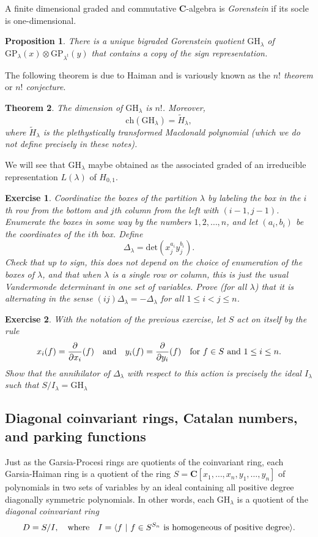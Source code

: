 \documentclass[12pt, reqno]{amsart}
\numberwithin{equation}{section}
\theoremstyle{definition}
\theoremstyle{plain}
\newtheorem{theorem}{Theorem}[section]
\newtheorem{proposition}[theorem]{Proposition}
\newtheorem{exercise}{Exercise}
\newcommand{\CC}{\mathbf{C}}
\newcommand{\la}{\langle}
\newcommand{\ra}{\rangle}
\begin{document}
A finite dimensional graded and commutative $\CC$-algebra is \emph{Gorenstein} if its socle is one-dimensional.

\begin{proposition}
There is a unique bigraded Gorenstein quotient $\mathrm{GH}_\lambda$ of $\mathrm{GP}_\lambda(x) \otimes \mathrm{GP}_{\lambda^t}(y)$ that contains a copy of the sign representation.
\end{proposition}

The following theorem is due to Haiman and is variously known as the \emph{$n!$ theorem} or \emph{$n!$ conjecture}.
\begin{theorem}
The dimension of $\mathrm{GH}_\lambda$ is $n!$. Moreover, 
$$\mathrm{ch}(\mathrm{GH}_\lambda)=\widetilde{H}_\lambda,$$ where $\widetilde{H}_\lambda$ is the plethystically transformed Macdonald polynomial (which we do not define precisely in these notes).
\end{theorem} We will see that $\mathrm{GH}_\lambda$ maybe obtained as the associated graded of an irreducible representation $L(\lambda)$ of $H_{0,1}$.

\begin{exercise}
Coordinatize the boxes of the partition $\lambda$ by labeling the box in the $i$th row from the bottom and $j$th column from the left with $(i-1,j-1)$. Enumerate the boxes in some way by the numbers $1,2,\dots,n$, and let $(a_i,b_i)$ be the coordinates of the $i$th box. Define
$$\Delta_\lambda=\mathrm{det}(x_j^{a_i} y_j^{b_i}).$$Check that up to sign, this does not depend on the choice of enumeration of the boxes of $\lambda$, and that when $\lambda$ is a single row or column, this is just the usual Vandermonde determinant in one set of variables. Prove (for all $\lambda$) that it is \emph{alternating} in the sense $(ij)\Delta_\lambda=-\Delta_\lambda$ for all $1 \leq i < j \leq n$.\end{exercise}

\begin{exercise}
With the notation of the previous exercise, let $S$ act on itself by the rule $$x_i(f)=\frac{\partial}{\partial x_i}(f) \quad \text{and} \quad y_i(f)=\frac{\partial}{\partial y_i}(f) \quad \hbox{for $f \in S$ and $1 \leq i \leq n$.}$$	 Show that the annihilator of $\Delta_\lambda$ with respect to this action is precisely the ideal $I_\lambda$ such that $S/I_\lambda=\mathrm{GH}_\lambda$
\end{exercise}

\subsection{Diagonal coinvariant rings, Catalan numbers, and parking functions} Just as the Garsia-Procesi rings are quotients of the coinvariant ring, each Garsia-Haiman ring is a quotient of the ring $S=\CC[x_1,\dots,x_n,y_1,\dots,y_n]$ of polynomials in two sets of variables by an ideal containing all positive degree diagonally symmetric polynomials. In other words, each $\mathrm{GH}_\lambda$ is a quotient of the \emph{diagonal coinvariant ring}
$$D=S / I, \quad \text{where} \quad I=\la f \ | \ f \in S^{S_n} \ \hbox{is homogeneous of positive degree} \ra.$$
\end{document}
